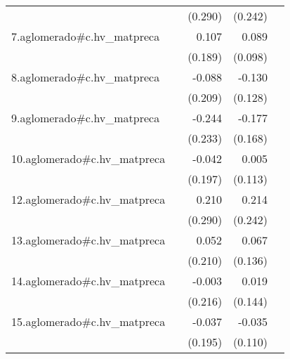 {\begin{longtable}{l*{4}{D{.}{.}{-1}}}
            &                     &     (0.290)         &     (0.242)         &                     \\
\addlinespace
7.aglomerado#c.hv\_matpreca&                     &       0.107         &       0.089         &                     \\
            &                     &     (0.189)         &     (0.098)         &                     \\
\addlinespace
8.aglomerado#c.hv\_matpreca&                     &      -0.088         &      -0.130         &                     \\
            &                     &     (0.209)         &     (0.128)         &                     \\
\addlinespace
9.aglomerado#c.hv\_matpreca&                     &      -0.244         &      -0.177         &                     \\
            &                     &     (0.233)         &     (0.168)         &                     \\
\addlinespace
10.aglomerado#c.hv\_matpreca&                     &      -0.042         &       0.005         &                     \\
            &                     &     (0.197)         &     (0.113)         &                     \\
\addlinespace
12.aglomerado#c.hv\_matpreca&                     &       0.210         &       0.214         &                     \\
            &                     &     (0.290)         &     (0.242)         &                     \\
\addlinespace
13.aglomerado#c.hv\_matpreca&                     &       0.052         &       0.067         &                     \\
            &                     &     (0.210)         &     (0.136)         &                     \\
\addlinespace
14.aglomerado#c.hv\_matpreca&                     &      -0.003         &       0.019         &                     \\
            &                     &     (0.216)         &     (0.144)         &                     \\
\addlinespace
15.aglomerado#c.hv\_matpreca&                     &      -0.037         &      -0.035         &                     \\
            &                     &     (0.195)         &     (0.110)         &                     \\

\end{longtable}}
